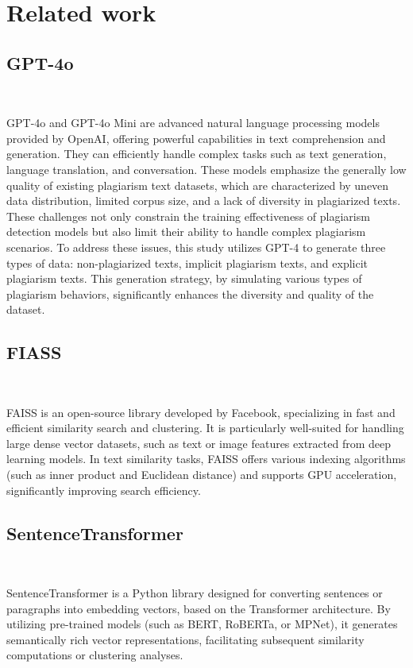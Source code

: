 \section{Related work}

\subsection{GPT-4o}
\ 

GPT-4o and GPT-4o \cite{chatgpt}Mini are advanced natural language processing models provided by OpenAI, offering powerful capabilities in text comprehension and generation. They can efficiently handle complex tasks such as text generation, language translation, and conversation. These models \cite{yuanjibao} emphasize the generally low quality of existing plagiarism text datasets, which are characterized by uneven data distribution, limited corpus size, and a lack of diversity in plagiarized texts. These challenges not only constrain the training effectiveness of plagiarism detection models but also limit their ability to handle complex plagiarism scenarios. To address these issues, this study utilizes GPT-4 to generate three types of data: non-plagiarized texts, implicit plagiarism texts, and explicit plagiarism texts. This generation strategy, by simulating various types of plagiarism behaviors, significantly enhances the diversity and quality of the dataset.

\subsection{FIASS}
\

FAISS is an open-source library developed by Facebook, specializing in fast and efficient similarity search and clustering. It is particularly well-suited for handling large dense vector datasets, such as text or image features extracted from deep learning models. In text similarity tasks, FAISS offers various indexing algorithms (such as inner product and Euclidean distance) and supports GPU acceleration, significantly improving search efficiency.

\subsection{SentenceTransformer}
\

SentenceTransformer is a Python library designed for converting sentences or paragraphs into embedding vectors, based on the Transformer architecture. By utilizing pre-trained models (such as BERT, RoBERTa, or MPNet), it generates semantically rich vector representations, facilitating subsequent similarity computations or clustering analyses.

